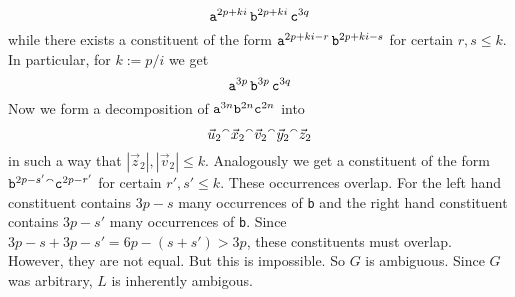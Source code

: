 \begin{equation}
\mbox{\tt a}^{2p + ki}\, \mbox{\tt b}^{2p+ki} \, \mbox{\tt c}^{3q}
\end{equation}
while there exists a constituent of the form $\mbox{\tt a}^{2p + ki - r}\,
\mbox{\tt b}^{2p + ki - s}$ for certain $r, s \leq k$. In particular,
for $k := p/i$ we get
\begin{equation}
\mbox{\tt a}^{3p}\, \mbox{\tt b}^{3p}\, \mbox{\tt c}^{3q}
\end{equation}
Now we form a decomposition of
$\mbox{\tt a}^{3n} \mbox{\tt b}^{2n} \mbox{\tt c}^{2n}$ into
\begin{equation}
\vec{u}_2{^{\smallfrown}} \vec{x}_2{^{\smallfrown}} \vec{v}_2{^{\smallfrown}} \vec{y}_2{^{\smallfrown}} \vec{z}_2
\end{equation}
in such a way that $|\vec{z}_2|, |\vec{v}_2| \leq k$. Analogously
we get a constituent of the form $\mbox{\tt b}^{2p - s'}{^{\smallfrown}} 
\mbox{\tt c}^{2p - r'}$ for certain $r', s' \leq k$. These
occurrences overlap. For the left hand constituent contains $3p - s$ many
occurrences of {\tt b} and the right hand constituent contains $3p
- s'$ many occurrences of {\tt b}. Since $3p - s + 3p - s' = 6p -
(s + s') > 3p$, these constituents must overlap. However, they are
not equal. But this is impossible. So $G$ is ambiguous. Since $G$
was arbitrary, $L$ is inherently ambigous.
\proofend

